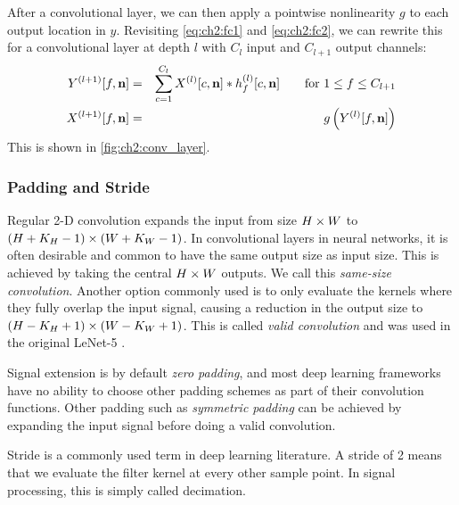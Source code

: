 After a convolutional layer, we can then apply a pointwise nonlinearity $g$ to
each output location in $y$. Revisiting \eqref{eq:ch2:fc1} and \eqref{eq:ch2:fc2}, we can 
rewrite this for a convolutional layer at depth $l$ with $C_l$ input and
$C_{l+1}$ output channels:
\begin{eqnarray}
  Y^{(l+1)}[f, \mathbf{n}] &=& \sum_{c=1}^{C_l} X^{(l)}[c, \mathbf{n}] \ast h^{(l)}_f[c, \mathbf{n}] \qquad 
    \text{for } 1 \leq f \leq C_{l+1} \label{eq:ch2:conv4}\\
  X^{(l+1)}[f, \mathbf{n}] &=& g\left(Y^{(l)}[f, \mathbf{n}]\right)
\end{eqnarray}
This is shown in \autoref{fig:ch2:conv_layer}.

\begin{figure}
  \centering
  
  \label{fig:ch2:conv_layer}
\end{figure}

\subsubsection{Padding and Stride}
Regular 2-D convolution expands the input from size $H\times W$ to $(H+K_H-1)\times
(W+K_W-1)$. In convolutional layers in neural networks, it is often desirable
and common to have the same output size as input size. This is achieved by
taking the central $H\times W$ outputs. We call this \emph{same-size convolution}.
Another option commonly used is to only evaluate the kernels where they fully
overlap the input signal, causing a reduction in the output size to $(H-K_H+1)
\times (W-K_W+1)$. This is called \emph{valid convolution} and was used in the
original LeNet-5 \cite{lecun_gradient-based_1998}.

Signal extension is by default \emph{zero padding}, and most deep learning
frameworks have no ability to choose other padding schemes as part of their
convolution functions. Other padding such as \emph{symmetric padding} can be
achieved by expanding the input signal before doing a valid convolution.

Stride is a commonly used term in deep learning literature. A stride of 2 means
that we evaluate the filter kernel at every other sample point. In signal
processing, this is simply called decimation.


